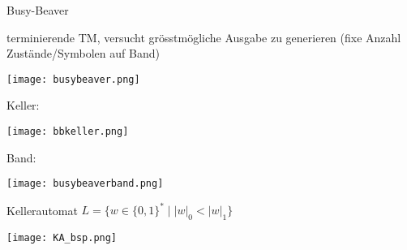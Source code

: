\begin{example2}{Busy-Beaver} 
    
    \begin{minipage}{0.4\linewidth}
    terminierende TM, versucht grösstmögliche Ausgabe zu generieren (fixe Anzahl Zustände/Symbolen auf Band)
    \end{minipage}
    \begin{minipage}{0.6\linewidth}
    \texttt{[image: busybeaver.png]}
    \end{minipage}

    \vspace{2mm}

    \begin{minipage}{0.6\linewidth}
        Keller:

        \texttt{[image: bbkeller.png]}
    \end{minipage}
    \begin{minipage}{0.25\linewidth}
        Band:
        
        \vspace{1mm}

        \texttt{[image: busybeaverband.png]}
    \end{minipage}
\end{example2}

\begin{example2}{Kellerautomat} $L=\{w \in \{0,1\}^{*} \mid |w|_0 < |w|_1\}$

    \texttt{[image: KA\_bsp.png]}
    
\end{example2}

